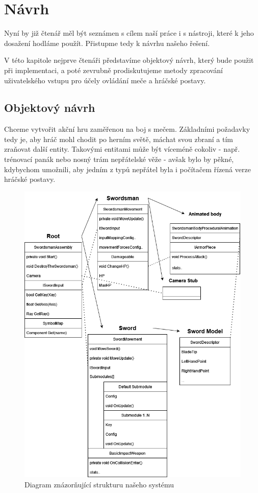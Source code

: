 \chapter{Návrh}

Nyní by již čtenář měl být seznámen s cílem naší práce i s nástroji, které k jeho dosažení hodláme použít. Přistupme tedy k návrhu našeho řešení.

V této kapitole nejprve čtenáři představíme objektový návrh, který bude použit při implementaci, a poté zevrubně prodiskutujeme metody zpracování uživatelského vstupu pro účely ovládání meče a hráčské postavy.


\section{Objektový návrh}

Chceme vytvořit akční hru zaměřenou na boj s mečem. Základními požadavky tedy je, aby hráč mohl chodit po herním světě, máchat svou zbraní a tím zraňovat další entity. Takovými entitami může být víceméně cokoliv - např. trénovací panák nebo nosný trám nepřátelské věže - avšak bylo by pěkné, kdybychom umožnili, aby jedním z typů nepřátel byla i počítačem řízená verze hráčské postavy.

\begin{figure}[p]\centering
    \center
    \includegraphics[width=145mm]{../img/Structure-diagram.png}
    \caption{Diagram znázorňující strukturu našeho systému}
    \label{obr04:objectModelDiagram}
\end{figure} 

